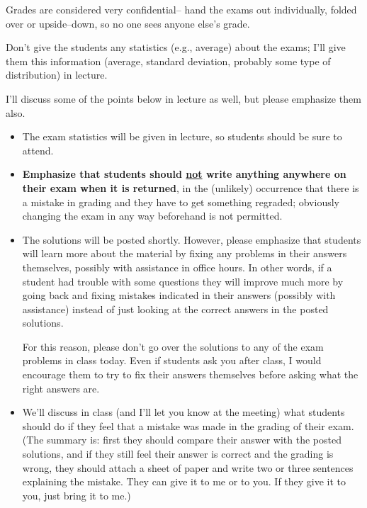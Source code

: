 \documentclass[12pt]{article}
\begin{document}
      Grades are considered very confidential-- hand the exams out
    individually, folded over or upside--down, so no one sees anyone else's
    grade.

      Don't give the students any statistics (e.g., average) about the exams;
    I'll give them this information (average, standard deviation, probably
    some type of distribution) in lecture.

      I'll discuss some of the points below in lecture as well, but please
    emphasize them also.

      \vspace{-2.5mm}

      \begin{itemize}

        \addtolength{\itemsep}{-1mm}

        \item The exam statistics will be given in lecture, so students
              should be sure to attend.

        \item \textbf{Emphasize that students should \underline{not} write
              anything anywhere on their exam when it is returned}, in the
              (unlikely) occurrence that there is a mistake in grading and
              they have to get something regraded; obviously changing the
              exam in any way beforehand is not permitted.

        \item The solutions will be posted shortly.  However, please
              emphasize that students will learn more about the material by
              fixing any problems in their answers themselves, possibly with
              assistance in office hours.  In other words, if a student had
              trouble with some questions they will improve much more by
              going back and fixing mistakes indicated in their answers
              (possibly with assistance) instead of just looking at the
              correct answers in the posted solutions.

              For this reason, please don't go over the solutions to any of
              the exam problems in class today.  Even if students ask you
              after class, I would encourage them to try to fix their
              answers themselves before asking what the right answers are.

        \item We'll discuss in class (and I'll let you know at the meeting)
              what students should do if they feel that a mistake was made
              in the grading of their exam.  (The summary is: first they
              should compare their answer with the posted solutions, and if
              they still feel their answer is correct and the grading is
              wrong, they should attach a sheet of paper and write two or
              three sentences explaining the mistake.  They can give it to
              me or to you.  If they give it to you, just bring it to me.)


\end{itemize}
\end{document}
